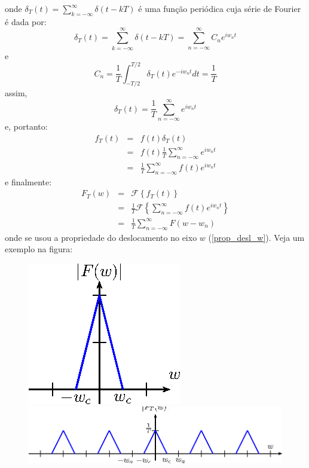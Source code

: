\documentclass[a4paper,10pt]{book}
\begin{document}
 onde $\delta_T(t)=\sum_{k=-\infty}^\infty \delta (t-kT)$ é uma função periódica cuja série de Fourier é dada por:
 \begin{equation}\delta_T(t)=\sum_{k=-\infty}^\infty \delta (t-kT)=\sum_{n=-\infty}^\infty C_n e^{iw_n t}\end{equation}
 e
 \begin{equation}C_n=\frac{1}{T}\int_{-T/2}^{T/2}\delta_T(t) e^{-iw_n t}dt=\frac{1}{T}\end{equation}
 assim,
 \begin{equation}\delta_T(t)=\frac{1}{T}\sum_{n=-\infty}^\infty  e^{iw_n t}\end{equation}
 e, portanto:
 \begin{eqnarray*}
 f_T(t)&=&f(t)\delta_T(t)\\
 &=& f(t)\frac{1}{T}\sum_{n=-\infty}^\infty  e^{iw_n t}\\
 &=&\frac{1}{T}\sum_{n=-\infty}^\infty f(t) e^{iw_n t}
 \end{eqnarray*}
 e finalmente:
 \begin{eqnarray*}
 F_T(w)&=&\mathcal{F}\left\{f_T(t)\right\}\\
 &=&\frac{1}{T}\mathcal{F}\left\{\sum_{n=-\infty}^\infty f(t) e^{iw_n t}\right\}\\
 &=&\frac{1}{T}\sum_{n=-\infty}^\infty F(w-w_n)
 \end{eqnarray*}
 onde se usou a propriedade do deslocamento no eixo $w$ (\ref{prop_desl_w}). Veja um exemplo na figura:
 \begin{figure}[!ht]
 \begin{center}
 \includegraphics{figs/cap_propriedades_transformada_figura_9}
 \hspace{10pt}
 \includegraphics{figs/cap_propriedades_transformada_figura_10}\end{center}
 \caption{\label{sinal_discreto1}}
 \end{figure}
 
\end{document}
